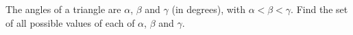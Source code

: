 The angles of a triangle are $\alpha$, $\beta$ and $\gamma$ (in degrees), with $\alpha<\beta<\gamma$. Find the set of all possible values of each of $\alpha$, $\beta$ and $\gamma$.
